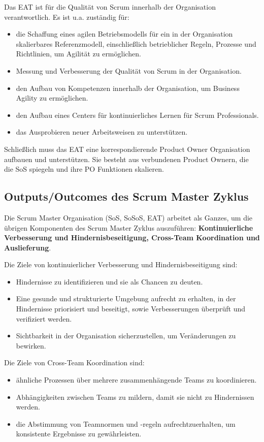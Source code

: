 \documentclass[12pt,a4paper,parskip=full]{scrartcl}
\begin{document}
Das EAT ist für die Qualität von Scrum innerhalb der Organisation verantwortlich.
Es ist u.a. zuständig für:
\begin{itemize}
\item die Schaffung eines agilen Betriebsmodells für ein in der Organisation
skalierbares Referenzmodell, einschließlich betrieblicher Regeln, Prozesse und
Richtlinien, um Agilität zu ermöglichen.
\item Messung und Verbesserung der Qualität von Scrum in der Organisation.
\item den Aufbau von Kompetenzen innerhalb der Organisation, um Business Agility zu ermöglichen.
\item den Aufbau eines Centers für kontinuierliches Lernen für Scrum Professionals.
\item das Ausprobieren neuer Arbeitsweisen zu unterstützen.
\end{itemize}
Schließlich muss das EAT eine korrespondierende Product Owner Organisation
aufbauen und unterstützen. Sie besteht aus verbundenen Product Ownern, die die
SoS spiegeln und ihre PO Funktionen skalieren.

\subsection{Outputs/Outcomes des Scrum Master Zyklus}
Die Scrum Master Organisation (SoS, SoSoS, EAT) arbeitet als Ganzes, um die
übrigen Komponenten des Scrum Master Zyklus auszuführen: \textbf{Kontinuierliche Verbesserung
und Hindernisbeseitigung, Cross-Team Koordination und Auslieferung}.

Die Ziele von kontinuierlicher Verbesserung und Hindernisbeseitigung sind:
\begin{itemize}
\item Hindernisse zu identifizieren und sie als Chancen zu deuten.
\item Eine gesunde und strukturierte Umgebung aufrecht zu erhalten, in der
Hindernisse priorisiert und beseitigt, sowie Verbesserungen überprüft
und verifiziert werden.
\item Sichtbarkeit in der Organisation sicherzustellen, um Veränderungen zu bewirken.
\end{itemize}
Die Ziele von Cross-Team Koordination sind:
\begin{itemize}
\item ähnliche Prozessen über mehrere zusammenhängende Teams zu koordinieren.
\item Abhängigkeiten zwischen Teams zu mildern, damit sie nicht zu Hindernissen werden.
\item die Abstimmung von Teamnormen und -regeln aufrechtzuerhalten, um konsistente
Ergebnisse zu gewährleisten.
\end{itemize}
\end{document}
